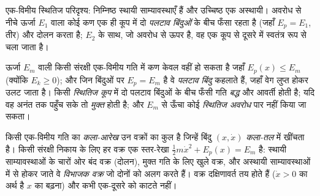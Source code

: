 \begin{omfigure}

{\small एक-विमीय स्थितिज परिदृश्य: निम्निष्ठ स्थायी साम्यावस्थाएँ हैं और
उच्चिष्ठ एक अस्थायी। अवरोध से नीचे ऊर्जा $E_1$ वाला कोई कण एक ही कूप में
दो \emph{पलटाव बिंदुओं} के बीच फँसा रहता है (जहाँ $E_p = E_1$, तीर) और दोलन
करता है; $E_2$ के साथ, जो अवरोध से ऊपर है, वह एक कूप से दूसरे में स्वतंत्र
रूप से चला जाता है।}
\end{omfigure}

\begin{definition}[पलटाव बिंदु; बद्ध और मुक्त गति]\label{def:b1:work-and-energy:turning}
ऊर्जा $E_m$ वाली किसी संरक्षी एक-विमीय गति में कण केवल वहीं हो सकता है जहाँ
$E_p(x) \leq E_m$ (क्योंकि $E_k \geq 0$); और जिन बिंदुओं पर $E_p = E_m$ है वे
\emph{पलटाव बिंदु} कहलाते हैं, जहाँ वेग लुप्त होकर उलट जाता है। किसी
\emph{स्थितिज कूप} में दो पलटाव बिंदुओं के बीच फँसी गति \emph{बद्ध} और
आवर्ती होती है; यदि वह अनंत तक पहुँच सके तो \emph{मुक्त} होती है; और $E_m$
से ऊँचा कोई \emph{स्थितिज अवरोध} पार नहीं किया जा
सकता।
\end{definition}

\begin{definition}[कला-आरेख]\label{def:b1:work-and-energy:phase}
किसी एक-विमीय गति का \emph{कला-आरेख} उन वक्रों का कुल है जिन्हें बिंदु
$(x, \dot x)$ \emph{कला-तल} में खींचता है। किसी संरक्षी निकाय के लिए हर
वक्र एक स्तर-रेखा $\tfrac12 m\dot x^2 +
E_p(x) = E_m$ है: स्थायी साम्यावस्थाओं के चारों ओर बंद वक्र (दोलन), मुक्त
गति के लिए खुले वक्र, और अस्थायी साम्यावस्थाओं में से होकर जाते वे
\emph{विभाजक वक्र} जो दोनों को अलग करते हैं। वक्र दक्षिणावर्त तय होते हैं
($\dot x > 0$ का अर्थ है $x$ का बढ़ना) और कभी एक-दूसरे को काटते नहीं।
\end{definition}

